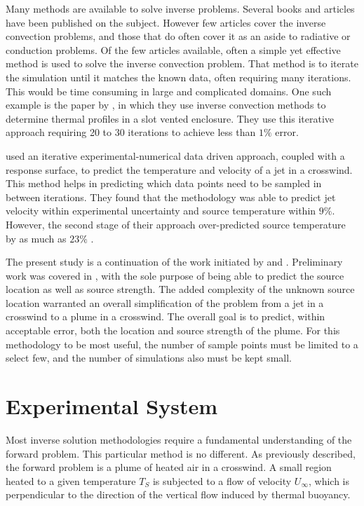 \documentclass[preprint,12pt]{elsarticle}
\begin{document}
Many methods are available to solve inverse problems.  Several books \cite{tikhonov, tikhonov2, ozisik, orlande} and articles \cite{invconduction,invradiation,jones,daun,mossi,erturk} have been published on the subject.  However few articles cover the inverse convection problems, and those that do often cover it as an aside to radiative or conduction problems.  Of the few articles available, often a simple yet effective method is used to solve the inverse convection problem.  That method is to iterate the simulation until it matches the known data, often requiring many iterations.  This would be time consuming in large and complicated domains.  One such example is the paper by \citet{liu}, in which they use inverse convection methods to determine thermal profiles in a slot vented enclosure.  They use this iterative approach requiring 20 to 30 iterations to achieve less than $1\%$ error.  

\citet{knight} used an iterative experimental-numerical data driven approach, coupled with a response surface, to predict the temperature and velocity of a jet in a crosswind.  This method helps in predicting which data points need to be sampled in between iterations.  They found that the methodology was able to predict jet velocity within experimental uncertainty and source temperature within $9\%$.  However, the second stage of their approach over-predicted source temperature by as much as $23\%$ \cite{knight,rossmann}.

The present study is a continuation of the work initiated by \citet{knight} and \citet{rossmann}.  Preliminary work was covered in \cite{cht12}, with the sole purpose of being able to predict the source location as well as source strength.  The added complexity of the unknown source location warranted an overall simplification of the problem from a jet in a crosswind to a plume in a crosswind.  The overall goal is to predict, within acceptable error, both the location and source strength of the plume.  For this methodology to be most useful, the number of sample points must be limited to a select few, and the number of simulations also must be kept small.

\section{Experimental System}
Most inverse solution methodologies require a fundamental understanding of the forward problem.  This particular method is no different.  As previously described, the forward problem is a plume of heated air in a crosswind.  A small region heated to a given temperature $T_S$ is subjected to a flow of velocity $U_\infty$, which is perpendicular to the direction of the vertical flow induced by thermal buoyancy.
\end{document}
